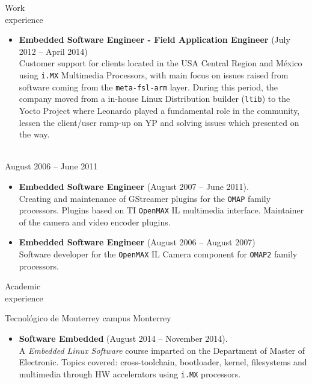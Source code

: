 \documentclass{resume}
\def\itesm{Tecnol\'ogico de Monterrey campus Monterrey}
\begin{document}
\begin{category}{Work \\experience}
\begin{itemize}
\item \textbf{Embedded Software Engineer - Field Application Engineer} (July 2012 -- April 2014)\\
  Customer support for clients located in the USA Central Region and M\'exico using
  \texttt{i.MX} Multimedia Processors, with main focus on issues raised from software
  coming from the \texttt{meta-fsl-arm} layer. During this period, the company
  moved from a in-house Linux Distribution builder (\texttt{ltib}) to the Yocto Project
  where Leonardo played a fundamental role in the community, lessen the client/user
  ramp-up on YP and solving issues which presented on the way.
\end{itemize}

\\
August 2006 -- June 2011
\begin{itemize}
\item \textbf{Embedded Software Engineer} (August 2007 -- June 2011).\\
  Creating and maintenance of GStreamer plugins for the \texttt{OMAP} family
  processors. Plugins based on TI \texttt{OpenMAX} IL multimedia interface.
  Maintainer of the camera and video encoder plugins.
\item \textbf{Embedded Software Engineer} (August 2006 -- August 2007)\\
  Software developer for the \texttt{OpenMAX} IL Camera component for
  \texttt{OMAP2} family processors.
\end{itemize}
\end{category}

\begin{category}{Academic \\experience}

\citem\itesm\\
\begin{itemize}
\item \textbf{Software Embedded} (August 2014 -- November 2014).\\
  A \textit{Embedded Linux Software} course imparted on the Department of
  Master of Electronic. Topics covered: cross-toolchain, bootloader,
  kernel, filesystems and multimedia through HW accelerators using
  \texttt{i.MX} processors.
\end{itemize}
\end{category}
\end{document}
